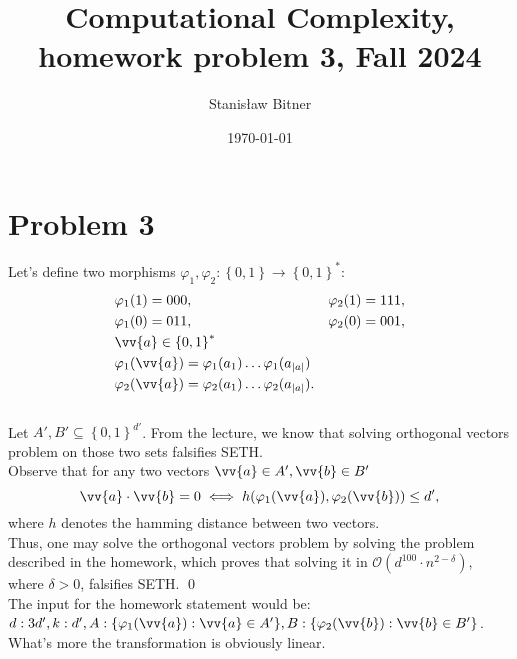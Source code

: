 \documentclass[11pt]{article}
\title{Computational Complexity, homework problem 3, Fall 2024}
\author{Stanisław Bitner}
\date{\today}
\begin{document}
\maketitle

\section*{Problem 3}
Let's define two morphisms $\varphi_1, \varphi_2 : \left\{ 0,1 \right\}
\rightarrow \left\{ 0,1 \right\}^*$:
\begin{align*}
    &\varphi_1(1) = 000, & &\varphi_2(1) = 111,\\
    &\varphi_1(0) = 011, & &\varphi_2(0) = 001,\\
    &\vv{a} \in \left\{0,1\right\}^*\\
    &\varphi_1(\vv{a}) = \varphi_1(a_1) \ldots \varphi_1(a_{|a|})\\
    &\varphi_2(\vv{a}) = \varphi_2(a_1) \ldots \varphi_2(a_{|a|}).
\end{align*}\\
Let $A',B' \subseteq \left\{0,1\right\}^{d'}$. From the lecture, we know that
solving orthogonal vectors problem on those two sets falsifies SETH.\\
Observe that for any two vectors $\vv{a} \in A', \vv{b} \in B'$
$$ \vv{a} \cdot \vv{b} = 0 \iff h(\varphi_1(\vv{a}), \varphi_2(\vv{b})) \le d', $$
where $h$ denotes the hamming distance between two vectors.
\\
Thus, one may solve the orthogonal vectors problem by solving the problem
described in the homework, which proves that solving it in
$\mathcal{O}(d^{100} \cdot n^{2-\delta})$, where $\delta>0$, falsifies SETH. \qed\\
The input for the homework statement would be:\\
$d:3d', k:d', A:\{\varphi_1(\vv{a}) : \vv{a} \in A'\}, B:\{\varphi_2(\vv{b}) : \vv{b} \in B'\}$.\\
What's more the transformation is obviously linear.
\end{document}
